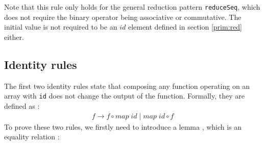 \documentclass{l4proj}
\begin{document}
Note that this rule only holds for the general reduction pattern \texttt{reduceSeq}, which does not require the binary operator being associative or commutative. The initial value is not required to be an $id$ element defined in section \ref{prim:red} either.

\subsection{Identity rules}
\label{alg:identity}
The first two identity rules state that composing any function operating on an array with \texttt{id} does not change the output of the function. Formally, they are defined as \citep{steuwer2015improving}:
\begin{align}
    f \to f \circ map\; id\; |\; map\; id \circ f
\end{align}
To prove these two rules, we firstly need to introduce a lemma , which is an equality relation \AgdaSpace{}%
\AgdaSpace{}%
\AgdaSpace{}%
\AgdaSpace{}%
:
\begin{code}%
\>[0]\AgdaSpace{}%
\AgdaSymbol{:}\AgdaSpace{}%
\AgdaSymbol{\{}\AgdaSpace{}%
\AgdaSymbol{:}\AgdaSpace{}%
\AgdaSymbol{\}}\AgdaSpace{}%
\AgdaSpace{}%
\AgdaSymbol{\{}\AgdaSpace{}%
\AgdaSymbol{:}\AgdaSpace{}%
\AgdaSymbol{\}}\AgdaSpace{}%
\AgdaSpace{}%
\AgdaSymbol{(}\AgdaSpace{}%
\AgdaSymbol{:}\AgdaSpace{}%
\AgdaSpace{}%
\AgdaSpace{}%
\AgdaSpace{}%
\AgdaSymbol{)}\AgdaSpace{}%
\AgdaSpace{}%
\AgdaSpace{}%
\AgdaSpace{}%
\AgdaSpace{}%
\AgdaSpace{}%
\<%
\\
\>[0]\AgdaSpace{}%
\AgdaInductiveConstructor{[]}\AgdaSpace{}%
\AgdaSymbol{=}\AgdaSpace{}%
\<%
\\
\>[0]\AgdaSpace{}%
\AgdaSymbol{(}\AgdaSpace{}%
\AgdaSpace{}%
\AgdaSymbol{)}\AgdaSpace{}%
\AgdaSymbol{=}\AgdaSpace{}%
\AgdaSpace{}%
\AgdaSymbol{(}\AgdaSpace{}%
\AgdaSymbol{)}\AgdaSpace{}%
\AgdaSymbol{(}\AgdaSpace{}%
\AgdaSymbol{)}\AgdaSpace{}\<%
\end{code}
\end{document}
